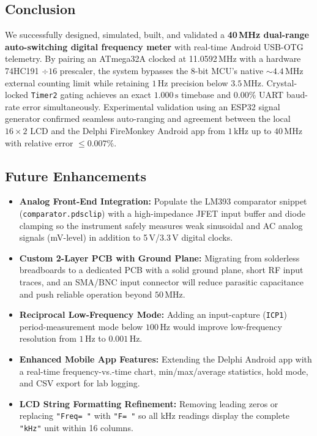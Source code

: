\documentclass[11pt,a4paper]{article}
\begin{document}
\subsection{Conclusion}
We successfully designed, simulated, built, and validated a \textbf{40\,MHz dual-range auto-switching digital frequency meter} with real-time Android USB-OTG telemetry. By pairing an ATmega32A clocked at 11.0592\,MHz with a hardware 74HC191 $\div 16$ prescaler, the system bypasses the 8-bit MCU's native $\sim 4.4\,\text{MHz}$ external counting limit while retaining $1\,\text{Hz}$ precision below $3.5\,\text{MHz}$. Crystal-locked \texttt{Timer2} gating achieves an exact $1.000\,\text{s}$ timebase and $0.00\%$ UART baud-rate error simultaneously. Experimental validation using an ESP32 signal generator confirmed seamless auto-ranging and agreement between the local $16\times 2$ LCD and the Delphi FireMonkey Android app from $1\,\text{kHz}$ up to $40\,\text{MHz}$ with relative error $\le 0.007\%$.

\subsection{Future Enhancements}
\begin{itemize}[leftmargin=1.5em]
    \item \textbf{Analog Front-End Integration:} Populate the LM393 comparator snippet (\texttt{comparator.pdsclip}) with a high-impedance JFET input buffer and diode clamping so the instrument safely measures weak sinusoidal and AC analog signals (mV-level) in addition to 5\,V/3.3\,V digital clocks.
    \item \textbf{Custom 2-Layer PCB with Ground Plane:} Migrating from solderless breadboards to a dedicated PCB with a solid ground plane, short RF input traces, and an SMA/BNC input connector will reduce parasitic capacitance and push reliable operation beyond $50\,\text{MHz}$.
    \item \textbf{Reciprocal Low-Frequency Mode:} Adding an input-capture (\texttt{ICP1}) period-measurement mode below $100\,\text{Hz}$ would improve low-frequency resolution from $1\,\text{Hz}$ to $0.001\,\text{Hz}$.
    \item \textbf{Enhanced Mobile App Features:} Extending the Delphi Android app with a real-time frequency-vs.-time chart, min/max/average statistics, hold mode, and CSV export for lab logging.
    \item \textbf{LCD String Formatting Refinement:} Removing leading zeros or replacing \texttt{"Freq= "} with \texttt{"F= "} so all kHz readings display the complete \texttt{"kHz"} unit within 16 columns.
\end{itemize}
\end{document}

